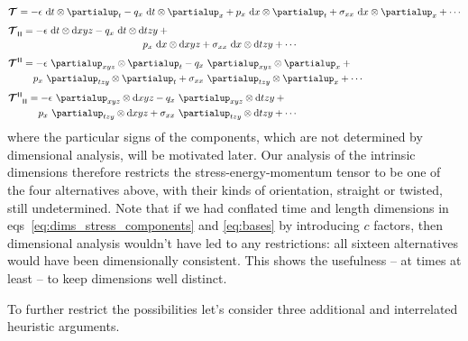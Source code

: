 \documentclass[\ifafour a4paper,12pt,\else a5paper,10pt,\fi%
onecolumn,oneside,article,%
british%
]{memoir}
\makeatletter
\theoremstyle{remark}
\theoremstyle{innote}
\newcommand*{\de}{\partialup}%
\newcommand*{\di}{\mathrm{d}}%
\renewcommand*{\|}[1][]{\nonscript\,#1\vert\nonscript\;\mathopen{}}
\newcommand*{\eqns}{eqs}%
\newcommand*{\q}{}%
\DeclareRobustCommand*{\q}{%
  \mathord{\mathpalette\bigcdot@{}}%
}
\newcommand*{\bigcdot@scalefactor}{0.7}
\newcommand*{\bigcdot@widthfactor}{1.5}
\newcommand*{\bigcdot@}[2]{%
  \sbox0{$#1\vcenter{}$}%
  \sbox2{$#1\cdot\m@th$}%
  \hbox to \bigcdot@widthfactor\wd2{%
    \hfil
    \raise\ht0\hbox{%
      \scalebox{\bigcdot@scalefactor}{%
        \lower\ht0\hbox{$#1\bullet\m@th$}%
      }%
    }%
    \hfil
  }%
}
\newcommand*{\yT}{\bm{\mathcal{T}}}
\renewcommand*{\i}{\indices}
\newcommand*{\en}{\epsilon}
\newcommand*{\yq}{q}
\newcommand*{\yp}{p}
\newcommand*{\yt}{\sigma}
\newcommand*{\dexyz}{\de_{xyz}}
\newcommand*{\detzy}{\de_{tzy}}
\newcommand*{\dixyz}{\di xyz}
\newcommand*{\ditzy}{\di tzy}
\newcommand*{\rul}{{\mkern2mu\rule[-0.1ex]{0.75pt}{1.1ex}\mkern2mu}}
\DeclarePairedDelimiter\mul{\rul}{\rul}%
\makeatother
\begin{document}
\begin{subequations}
  \label{eq:T_alternatives}
  \begin{align}
    \label{eq:T_co_contra}
    &\yT\i{_{\q}^{\q}} = -\en\  \di t\otimes\de_{t} 
      -\yq_{x}\  \di t\otimes\de_{x} +
      \yp_{x}\  \di x\otimes\de_{t} +
      \yt_{x x}\  \di x\otimes\de_{x} + \dotsb
    \\[\jot]
    \label{eq:T_co_co3}
    &\!\begin{multlined}[b][0.85\textwidth]
      \yT\i{_{\q\mul{\q\q\q}}} =
      -\en\  \di t\otimes\dixyz 
      -\yq_{x}\  \di t\otimes\ditzy +{}\\
      \yp_{x}\  \di x\otimes\dixyz 
      +\yt_{x x}\  \di x\otimes\ditzy + \dotsb
    \end{multlined}
    \\[\jot]
    \label{eq:T_contra3_contra}
    &\!\begin{multlined}[b][0.85\textwidth]
      \yT\i{^{\mul{\q\q\q}\q}} = -\en\  \dexyz \otimes\de_{t} 
      -\yq_{x}\  \dexyz\otimes\de_{x} +{}\\
      \yp_{x}\  \detzy \otimes\de_{t} +
      \yt_{x x}\  \detzy\otimes\de_{x} + \dotsb
    \end{multlined}
    \\[\jot]
    \label{eq:T_contra3_co3}
    &\!\begin{multlined}[b][0.85\textwidth]
      \yT\i{^{\mul{\q\q\q}}_{\mul{\q\q\q}}} = -\en\  \dexyz \otimes\dixyz 
      -\yq_{x}\  \dexyz\otimes\ditzy +{}\\
      \yp_{x}\  \detzy \otimes\dixyz 
      + \yt_{x x}\  \detzy\otimes\ditzy
      + \dotsb
    \end{multlined}
  \end{align}
\end{subequations}
where the particular signs of the components, which are not determined by
dimensional analysis, will be motivated later. Our analysis of the
intrinsic dimensions therefore restricts the stress-energy-momentum tensor
to be one of the four alternatives above, with their kinds of orientation,
straight or twisted, still undetermined. Note that if we had conflated time
and length dimensions in \eqns~\eqref{eq:dims_stress_components} and
\eqref{eq:bases} by introducing $c$ factors, then dimensional analysis
wouldn't have led to any restrictions: all sixteen alternatives would have
been dimensionally consistent. This shows the usefulness -- at times at
least -- to keep dimensions well distinct.

To further restrict the possibilities let's consider three additional and
interrelated heuristic arguments.
\end{document}
